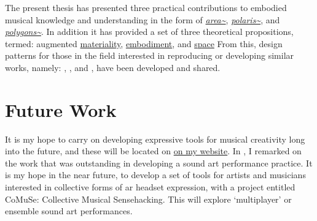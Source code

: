 The present thesis has presented three practical contributions to embodied musical knowledge and understanding in the form of \textit{\hyperref[sec: area]{area\textasciitilde{}}}, \textit{\hyperref[sec: polaris]{polaris\textasciitilde{}}}, and \textit{\hyperref[sec: polygons]{polygons\textasciitilde{}}}. In addition it has provided a set of three theoretical propositions, termed: augmented \hyperref[sec: discussion-medium-material]{materiality}, \hyperref[sec: discussion-medium-embodiment]{embodiment}, and \hyperref[sec: discussion-medium-space]{space} From this, design patterns for those in the field interested in reproducing or developing similar works, namely: \textit{}, \textit{}, and \textit{}, have been developed and shared. 

\section{Future Work}\label{sec: conclusion-futurework}
It is my hope to carry on developing expressive tools for musical creativity long into the future, and these will be located on \href{https://sambilbow.com}{on my website}. In \textit{}, I remarked on the work that was outstanding in developing a sound \gls{art} performance practice. It is my hope in the near future, to develop a set of tools for artists and musicians interested in collective forms of \gls{ar} headset expression, with a project entitled CoMuSe: Collective Musical Sensehacking. This will explore `multiplayer' or ensemble sound \gls{art} performances.
